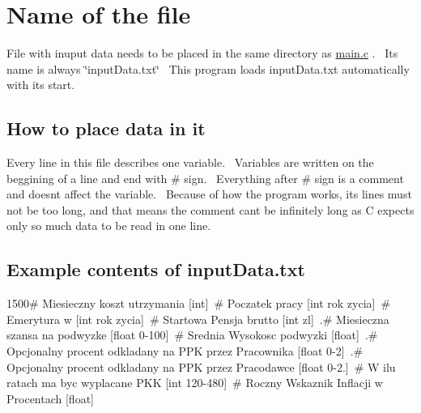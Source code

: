 \hypertarget{inputDataPage_name}{}\section{Name of the file}\label{inputDataPage_name}
File with inuput data needs to be placed in the same directory as \mbox{\hyperlink{main_8c}{main.\+c}} .~\newline
 It\textquotesingle{}s name is always \char`\"{}input\+Data.\+txt\char`\"{}~\newline
 This program loads input\+Data.\+txt automatically with it\textquotesingle{}s start.\hypertarget{inputDataPage_howto}{}\subsection{How to place data in it}\label{inputDataPage_howto}
Every line in this file describes one variable.~\newline
 Variables are written on the beggining of a line and end with \# sign.~\newline
 Everything after \# sign is a comment and doesn\textquotesingle{}t affect the variable.~\newline
 Because of how the program works, it\textquotesingle{}s lines must not be too long, and that means the comment can\textquotesingle{}t be infinitely long as C expects only so much data to be read in one line. \hypertarget{inputDataPage_subsection2}{}\subsection{Example contents of input\+Data.\+txt}\label{inputDataPage_subsection2}
1500\# Miesieczny koszt utrzymania \mbox{[}int\mbox{]}~\# Poczatek pracy \mbox{[}int rok zycia\mbox{]}~\# Emerytura w \mbox{[}int rok zycia\mbox{]}~\# Startowa Pensja brutto \mbox{[}int zl\mbox{]}~.\# Miesieczna szansa na podwyzke \mbox{[}float 0-\/100\mbox{]}~\# Srednia Wysokosc podwyzki \mbox{[}float\mbox{]}~.\# Opcjonalny procent odkladany na P\+PK przez Pracownika \mbox{[}float 0-\/2\mbox{]}~.\# Opcjonalny procent odkladany na P\+PK przez Pracodawce \mbox{[}float 0-\/2.\mbox{]}~\# W ilu ratach ma byc wyplacane P\+KK \mbox{[}int 120-\/480\mbox{]}~\# Roczny Wskaznik Inflacji w Procentach \mbox{[}float\mbox{]} 